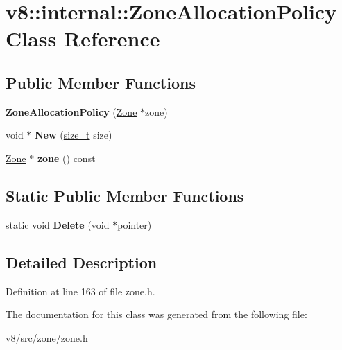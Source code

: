 \hypertarget{classv8_1_1internal_1_1ZoneAllocationPolicy}{}\section{v8\+:\+:internal\+:\+:Zone\+Allocation\+Policy Class Reference}
\label{classv8_1_1internal_1_1ZoneAllocationPolicy}
\subsection*{Public Member Functions}
\begin{DoxyCompactItemize}
\item 
\mbox{\label{classv8_1_1internal_1_1ZoneAllocationPolicy_a37f5884ffaf08def2a33fc91947ae68f}} 
{\bfseries Zone\+Allocation\+Policy} (\mbox{\hyperlink{classv8_1_1internal_1_1Zone}{Zone}} $\ast$zone)
\item 
\mbox{\label{classv8_1_1internal_1_1ZoneAllocationPolicy_a1e8b5efc63bbf48f81a6e774e9d96123}} 
void $\ast$ {\bfseries New} (\mbox{\hyperlink{classsize__t}{size\+\_\+t}} size)
\item 
\mbox{\label{classv8_1_1internal_1_1ZoneAllocationPolicy_a5f0053d20cf9f9db56e39e1af502922f}} 
\mbox{\hyperlink{classv8_1_1internal_1_1Zone}{Zone}} $\ast$ {\bfseries zone} () const
\end{DoxyCompactItemize}
\subsection*{Static Public Member Functions}
\begin{DoxyCompactItemize}
\item 
\mbox{\label{classv8_1_1internal_1_1ZoneAllocationPolicy_a9d9080d0d8ea07f8b043548d4645c7f8}} 
static void {\bfseries Delete} (void $\ast$pointer)
\end{DoxyCompactItemize}


\subsection{Detailed Description}


Definition at line 163 of file zone.\+h.



The documentation for this class was generated from the following file\+:\begin{DoxyCompactItemize}
\item 
v8/src/zone/zone.\+h\end{DoxyCompactItemize}
